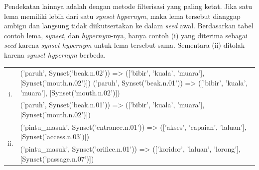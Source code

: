 Pendekatan lainnya adalah dengan metode filterisasi yang paling ketat. Jika satu lema memiliki lebih dari satu \textit{synset hypernym}, maka lema tersebut dianggap ambigu dan langsung tidak diikutsertakan ke dalam \textit{seed} awal. Berdasarkan tabel contoh lema, \textit{synset}, dan \textit{hypernym}-nya, hanya contoh (i) yang diterima sebagai \textit{seed} karena \textit{synset hypernym} untuk lema tersebut sama. Sementara (ii) ditolak karena \textit{synset hypernym} berbeda.

\begin{center}
\begin{tabular}{ |c|m{30em}| } 
\hline
\multirow{2}{*}{i.} & ('paruh', Synset('beak.n.02')) => (['bibir', 'kuala', 'muara'], [Synset('mouth.n.02')])
('paruh', Synset('beak.n.01')) => (['bibir', 'kuala', 'muara'], [Synset('mouth.n.02')]) \\ 
& ('paruh', Synset('beak.n.01')) => (['bibir', 'kuala', 'muara'], [Synset('mouth.n.02')]) \\ 
\hline
\multirow{2}{*}{ii.} & ('pintu\_masuk', Synset('entrance.n.01')) => (['akses', 'capaian', 'laluan'], [Synset('access.n.03')]) \\ 
& ('pintu\_masuk', Synset('orifice.n.01')) => (['koridor', 'laluan', 'lorong'], [Synset('passage.n.07')]) \\ 
\hline
\end{tabular}
\end{center}

